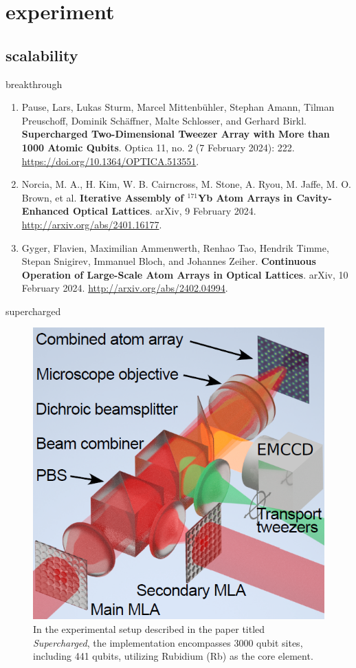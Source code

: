 \documentclass[18 pt]{beamer}
\begin{document}
\section{experiment}
\subsection{scalability}
\begin{frame}{breakthrough}
  \begin{enumerate}[itemsep=10pt]
    \item Pause, Lars, Lukas Sturm, Marcel Mittenbühler, Stephan Amann, Tilman Preuschoff, Dominik Schäffner, Malte Schlosser, and Gerhard Birkl. \textbf{Supercharged Two-Dimensional Tweezer Array with More than 1000 Atomic Qubits}. Optica 11, no. 2 (7 February 2024): 222. \url{https://doi.org/10.1364/OPTICA.513551}.
    \item Norcia, M. A., H. Kim, W. B. Cairncross, M. Stone, A. Ryou, M. Jaffe, M. O. Brown, et al. \textbf{Iterative Assembly of $^{171}$Yb Atom Arrays in Cavity-Enhanced Optical Lattices}. arXiv, 9 February 2024. \url{http://arxiv.org/abs/2401.16177}.
    \item Gyger, Flavien, Maximilian Ammenwerth, Renhao Tao, Hendrik Timme, Stepan Snigirev, Immanuel Bloch, and Johannes Zeiher. \textbf{Continuous Operation of Large-Scale Atom Arrays in Optical Lattices}. arXiv, 10 February 2024. \url{http://arxiv.org/abs/2402.04994}.
  \end{enumerate}
\end{frame}
\begin{frame}{supercharged}
\begin{figure}
  \includegraphics[width=.5\textwidth]{IMG/supercharhed.png}
  \caption{In the experimental setup described in the paper titled \textit{Supercharged}, the implementation encompasses 3000 qubit sites, including 441 qubits, utilizing Rubidium (Rb) as the core element.}
\end{figure}  
\end{frame}
\end{document}
